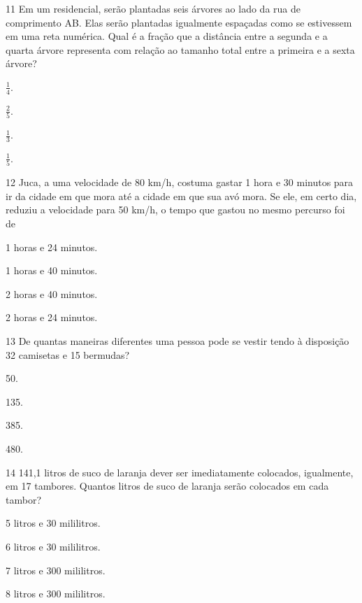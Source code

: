 \num{11} Em um residencial, serão plantadas seis árvores ao lado da rua de comprimento AB. Elas
serão plantadas igualmente espaçadas como se estivessem em uma reta numérica.
Qual é a fração que a distância entre a segunda e a quarta árvore
representa com relação ao tamanho total entre a primeira e a sexta árvore?

\begin{multicols}{2}
\begin{escolha}
\item
  $\frac{1}{4}$.
\item
  $\frac{2}{5}$.
\item
  $\frac{1}{3}$.
\item
  $\frac{1}{5}$.
\end{escolha}
\end{multicols}


\num{12} Juca, a uma velocidade de 80 km/h, costuma gastar 1 hora e 30 minutos
para ir da cidade em que mora até a cidade em que sua avó mora. Se ele,
em certo dia, reduziu a velocidade para 50 km/h, o tempo que gastou no mesmo percurso foi de

\begin{escolha}
\item
  1 horas e 24 minutos.
\item
  1 horas e 40 minutos.
\item
  2 horas e 40 minutos.
\item
  2 horas e 24 minutos.
\end{escolha}

\pagebreak
\num{13} De quantas maneiras diferentes uma pessoa pode se vestir tendo à
disposição 32 camisetas e 15 bermudas?

\begin{multicols}{2}
\begin{escolha}
\item
  50.
\item
  135.
\item
  385.
\item
  480.
\end{escolha}
\end{multicols}

\num{14} 141,1 litros de suco de laranja dever ser imediatamente colocados,
igualmente, em 17 tambores. Quantos litros de suco de laranja serão
colocados em cada tambor?

\begin{escolha}
\item
  5 litros e 30 mililitros.
\item
  6 litros e 30 mililitros.
\item
  7 litros e 300 mililitros.
\item
  8 litros e 300 mililitros.
\end{escolha}

